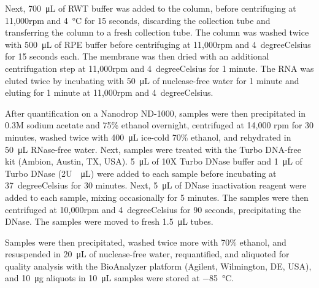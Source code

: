 Next, \SI{700}{\micro\liter} of RWT buffer was added to the column, before centrifuging at 11,000rpm and \SI{4}{\degreeCelsius} for 15 seconds, discarding the collection tube and transferring the column to a fresh collection tube. The column was washed twice with \SI{500}{\micro\liter} of RPE buffer before centrifuging at 11,000rpm and \SI{4}{degreeCelsius} for 15 seconds each. The membrane was then dried with an additional centrifugation step at 11,000rpm and \SI{4}{degreeCelsius} for 1 minute. The RNA was eluted twice by incubating with \SI{50}{\micro\liter} of nuclease-free water for 1 minute and eluting for 1 minute at 11,000rpm and \SI{4}{degreeCelsius}.

After quantification on a Nanodrop ND-1000, samples were then precipitated in 0.3M sodium acetate and 75\% ethanol overnight, centrifuged at 14,000 rpm for 30 minutes, washed twice with \SI{400}{\micro\liter} ice-cold 70\% ethanol, and rehydrated in \SI{50}{\micro\liter} RNase-free water. Next, samples were treated with the Turbo DNA-free kit (Ambion, Austin, TX, USA). \SI{5}{\micro\liter} of 10X Turbo DNase buffer and \SI{1}{\micro\liter} of Turbo DNase (2U\SI{}{\per\micro\liter}) were added to each sample before incubating at \SI{37}{degreeCelsius} for 30 minutes. Next, \SI{5}{\micro\liter} of DNase inactivation reagent were added to each sample, mixing occasionally for 5 minutes. The samples were then centrifuged at 10,000rpm and \SI{4}{degreeCelsius} for 90 seconds, precipitating the DNase. The samples were moved to fresh \SI{1.5}{\micro\liter} tubes.

Samples were then precipitated, washed twice more with 70\% ethanol, and resuspended in \SI{20}{\micro\liter} of nuclease-free water, requantified, and aliquoted for quality analysis with the BioAnalyzer platform (Agilent, Wilmington, DE, USA), and \SI{10}{\micro\gram} aliquots in \SI{10}{\micro\liter} samples were stored at \SI{-85}{\degreeCelsius}.

